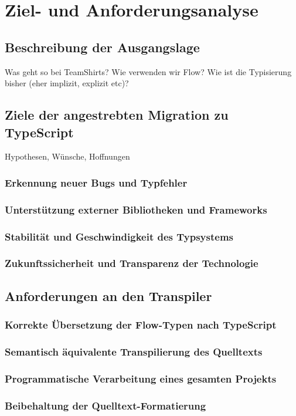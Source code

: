 \chapter{Ziel- und Anforderungsanalyse}

\section{Beschreibung der Ausgangslage}

Was geht so bei TeamShirts? Wie verwenden wir Flow? Wie ist die Typisierung bisher (eher implizit, explizit etc)?

\section{Ziele der angestrebten Migration zu TypeScript}

Hypothesen, Wünsche, Hoffnungen

  \subsection{Erkennung neuer Bugs und Typfehler}
  \subsection{Unterstützung externer Bibliotheken und Frameworks}
  \subsection{Stabilität und Geschwindigkeit des Typsystems}
  \subsection{Zukunftssicherheit und Transparenz der Technologie}

\section{Anforderungen an den Transpiler}

  \subsection{Korrekte Übersetzung der Flow-Typen nach TypeScript}
  \subsection{Semantisch äquivalente Transpilierung des Quelltexts}
  \subsection{Programmatische Verarbeitung eines gesamten Projekts}
  \subsection{Beibehaltung der Quelltext-Formatierung}
